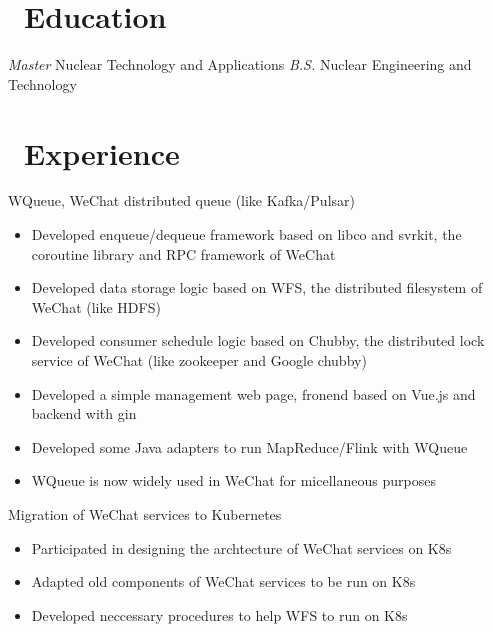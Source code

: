 \documentclass{resume}
\begin{document}



\section{\faGraduationCap\ Education}
\textit{Master} Nuclear Technology and Applications 
\textit{B.S.} Nuclear Engineering and Technology

\section{\faUsers\ Experience}

WQueue, WeChat distributed queue (like Kafka/Pulsar)
\begin{itemize}
  \item Developed enqueue/dequeue framework based on libco and svrkit, the coroutine library and RPC framework of WeChat
  \item Developed data storage logic based on WFS, the distributed filesystem of WeChat (like HDFS)
  \item Developed consumer schedule logic based on Chubby, the distributed lock service of WeChat (like zookeeper and Google chubby)
  \item Developed a simple management web page, fronend based on Vue.js and backend with gin
  \item Developed some Java adapters to run MapReduce/Flink with WQueue
  \item WQueue is now widely used in WeChat for micellaneous purposes
\end{itemize}

Migration of WeChat services to Kubernetes
\begin{itemize}
  \item Participated in designing the archtecture of WeChat services on K8s
  \item Adapted old components of WeChat services to be run on K8s
  \item Developed neccessary procedures to help WFS to run on K8s
\end{itemize}
\end{document}
